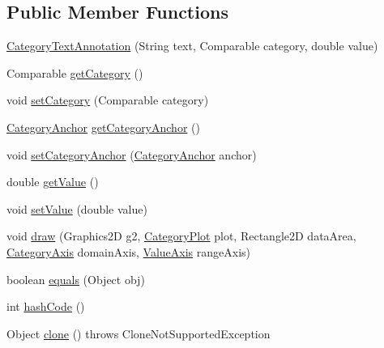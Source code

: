 \subsection*{Public Member Functions}
\begin{DoxyCompactItemize}
\item 
\mbox{\hyperlink{classorg_1_1jfree_1_1chart_1_1annotations_1_1_category_text_annotation_a1b9ac944fd1c6f5e9f505c165ab3abbc}{Category\+Text\+Annotation}} (String text, Comparable category, double value)
\item 
Comparable \mbox{\hyperlink{classorg_1_1jfree_1_1chart_1_1annotations_1_1_category_text_annotation_a8e8ceb3099ed1b881323510e6178b9a1}{get\+Category}} ()
\item 
void \mbox{\hyperlink{classorg_1_1jfree_1_1chart_1_1annotations_1_1_category_text_annotation_a46532a1111e31b9639fc19920219d4ec}{set\+Category}} (Comparable category)
\item 
\mbox{\hyperlink{classorg_1_1jfree_1_1chart_1_1axis_1_1_category_anchor}{Category\+Anchor}} \mbox{\hyperlink{classorg_1_1jfree_1_1chart_1_1annotations_1_1_category_text_annotation_a81b944db09089455549d298b78a8619e}{get\+Category\+Anchor}} ()
\item 
void \mbox{\hyperlink{classorg_1_1jfree_1_1chart_1_1annotations_1_1_category_text_annotation_afa9fb6f9815586605a76cb6f339a0c57}{set\+Category\+Anchor}} (\mbox{\hyperlink{classorg_1_1jfree_1_1chart_1_1axis_1_1_category_anchor}{Category\+Anchor}} anchor)
\item 
double \mbox{\hyperlink{classorg_1_1jfree_1_1chart_1_1annotations_1_1_category_text_annotation_ac041de5a5281948b0bd12e2442a9d248}{get\+Value}} ()
\item 
void \mbox{\hyperlink{classorg_1_1jfree_1_1chart_1_1annotations_1_1_category_text_annotation_afded63ce4398edd0bf3a20324eef26f7}{set\+Value}} (double value)
\item 
void \mbox{\hyperlink{classorg_1_1jfree_1_1chart_1_1annotations_1_1_category_text_annotation_aaa142ac74e58a54beacee9080766ebf2}{draw}} (Graphics2D g2, \mbox{\hyperlink{classorg_1_1jfree_1_1chart_1_1plot_1_1_category_plot}{Category\+Plot}} plot, Rectangle2D data\+Area, \mbox{\hyperlink{classorg_1_1jfree_1_1chart_1_1axis_1_1_category_axis}{Category\+Axis}} domain\+Axis, \mbox{\hyperlink{classorg_1_1jfree_1_1chart_1_1axis_1_1_value_axis}{Value\+Axis}} range\+Axis)
\item 
boolean \mbox{\hyperlink{classorg_1_1jfree_1_1chart_1_1annotations_1_1_category_text_annotation_ab7bb56236555c3d430dfbe5fa8a6a282}{equals}} (Object obj)
\item 
int \mbox{\hyperlink{classorg_1_1jfree_1_1chart_1_1annotations_1_1_category_text_annotation_a210b1b3097158108ee88085e8f546315}{hash\+Code}} ()
\item 
Object \mbox{\hyperlink{classorg_1_1jfree_1_1chart_1_1annotations_1_1_category_text_annotation_a8b2b8a24df6441c418faf59ed8624496}{clone}} ()  throws Clone\+Not\+Supported\+Exception 
\end{DoxyCompactItemize}
